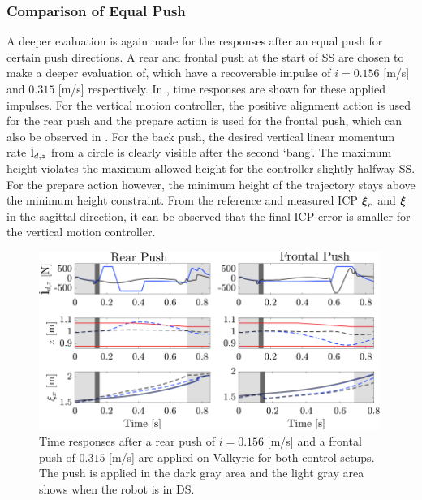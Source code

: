 \subsubsection{Comparison of Equal Push} 
A deeper evaluation is again made for the responses after an equal push for certain push directions. A rear and frontal push at the start of \ac{SS} are chosen to make a deeper evaluation of, which have a recoverable impulse of $i=0.156$ [m/s] and $0.315$ [m/s] respectively. In , time responses are shown for these applied impulses. For the vertical motion controller, the positive alignment action is used for the rear push and the prepare action is used for the frontal push, which can also be observed in . For the back push, the desired vertical linear momentum rate $\dot{\mathbf{l}}_{d,z}$ from a circle is clearly visible after the second `bang'. The maximum height violates the maximum allowed height for the controller slightly halfway \ac{SS}. For the prepare action however, the minimum height of the trajectory stays above the minimum height constraint. From the reference and measured \ac{ICP} $\boldsymbol{\xi}_r$ and $\boldsymbol{\xi}$ in the sagittal direction, it can be observed that the final \ac{ICP} error is smaller for the vertical motion controller.
\begin{figure}
     \centering
        \includegraphics[width=0.99\textwidth]{STYLESTUFF/walkplot.png}
    \caption{Time responses after a rear push of $i=0.156$ [m/s] and a frontal push of $0.315$ [m/s] are applied on Valkyrie for both control setups. The push is applied in the dark gray area and the light gray area shows when the robot is in \ac{DS}.}
    \label{fig:walkplot}
\end{figure}

